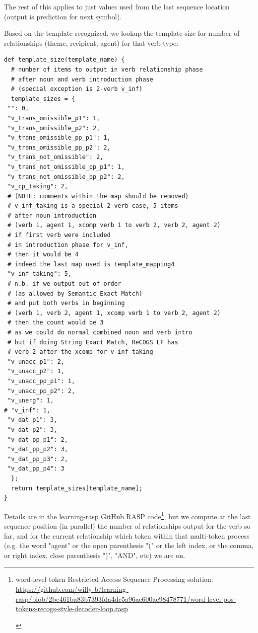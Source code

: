 \documentclass[11pt]{article}
\begin{document}
The rest of this applies to just values used from the last sequence location (output is prediction for next symbol).

Based on the template recognized, we lookup the template size for number of relationships (theme, recipient, agent) for that verb type:
\begin{tiny}
\begin{verbatim}
def template_size(template_name) {
  # number of items to output in verb relationship phase
  # after noun and verb introduction phase
  # (special exception is 2-verb v_inf)
  template_sizes = {
 "": 0,
 "v_trans_omissible_p1": 1,
 "v_trans_omissible_p2": 2,
 "v_trans_omissible_pp_p1": 1,
 "v_trans_omissible_pp_p2": 2,
 "v_trans_not_omissible": 2,
 "v_trans_not_omissible_pp_p1": 1,
 "v_trans_not_omissible_pp_p2": 2,
 "v_cp_taking": 2,
 # (NOTE: comments within the map should be removed)
 # v_inf_taking is a special 2-verb case, 5 items
 # after noun introduction
 # (verb 1, agent 1, xcomp verb 1 to verb 2, verb 2, agent 2)
 # if first verb were included 
 # in introduction phase for v_inf,
 # then it would be 4
 # indeed the last map used is template_mapping4
 "v_inf_taking": 5,
 # n.b. if we output out of order
 # (as allowed by Semantic Exact Match)
 # and put both verbs in beginning
 # (verb 1, verb 2, agent 1, xcomp verb 1 to verb 2, agent 2)
 # then the count would be 3
 # as we could do normal combined noun and verb intro
 # but if doing String Exact Match, ReCOGS LF has
 # verb 2 after the xcomp for v_inf_taking
 "v_unacc_p1": 2,
 "v_unacc_p2": 1,
 "v_unacc_pp_p1": 1,
 "v_unacc_pp_p2": 2,
 "v_unerg": 1,
# "v_inf": 1,
 "v_dat_p1": 3,
 "v_dat_p2": 3,
 "v_dat_pp_p1": 2,
 "v_dat_pp_p2": 3,
 "v_dat_pp_p3": 2,
 "v_dat_pp_p4": 3
  };
  return template_sizes[template_name];
}
\end{verbatim}
\end{tiny}

Details are in the learning-rasp GitHub RASP code\footnote{\begin{footnotesize}word-level token Restricted Access Sequence Processing solution: \href{https://github.com/willy-b/learning-rasp/blob/2be461ba83b7393fda4dc5a96ae600ac98478771/word-level-pos-tokens-recogs-style-decoder-loop.rasp}{https://github.com/willy-b/learning-rasp/blob/2be461ba83b7393fda4dc5a96ae600ac98478771/word-level-pos-tokens-recogs-style-decoder-loop.rasp} \end{footnotesize}}, but we compute at the last sequence position (in parallel) the number of relationships output for the verb so far, and for the current relationship which token within that multi-token process (e.g. the word "agent" or the open parenthesis "(" or the left index, or the comma, or right index, close parenthesis ")", "AND", etc) we are on.
\end{document}
